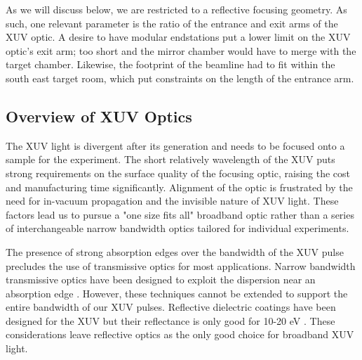
As we will discuss below, we are restricted to a reflective focusing geometry. As such, one relevant parameter is the ratio of the entrance and exit arms of the XUV optic. A desire to have modular endstations put a lower limit on the XUV optic's exit arm; too short and the mirror chamber would have to merge with the target chamber. Likewise, the footprint of the beamline had to fit within the south east target room, which put constraints on the length of the entrance arm.



\subsection{Overview of XUV Optics}

The XUV light is divergent after its generation and needs to be focused onto a sample for the experiment. The short relatively wavelength of the XUV puts strong requirements on the surface quality of the focusing optic, raising the cost and manufacturing time significantly. Alignment of the optic is frustrated by the need for in-vacuum propagation and the invisible nature of XUV light. These factors lead us to pursue a "one size fits all" broadband optic rather than a series of interchangeable narrow bandwidth optics tailored for individual experiments.

The presence of strong absorption edges over the bandwidth of the XUV pulse precludes the use of transmissive optics for most applications. Narrow bandwidth transmissive optics have been designed to exploit the dispersion near an absorption edge \cite{drescherExtremeultravioletRefractiveOptics2018}. However, these techniques cannot be extended to support the entire bandwidth of our XUV pulses. Reflective dielectric coatings have been designed for the XUV but their reflectance is only good for 10-20 eV \cite{kiesewetterDynamicsNearThresholdAttosecond2019}. These considerations leave reflective optics as the only good choice for broadband XUV light.

